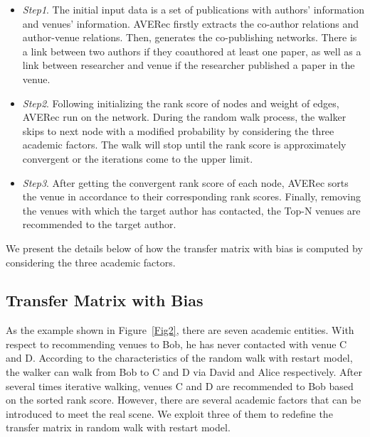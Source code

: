 \documentclass[9pt]{acm_proc_article-sp}
\begin{document}
\begin{itemize}
  \item \emph{Step1}. The initial input data is a set of publications with authors' information and venues' information. AVERec firstly extracts the co-author relations and author-venue relations. Then, generates the co-publishing networks. There is a link between two authors if they coauthored at least one paper, as well as a link between researcher and venue if the researcher published a paper in the venue.
  \item \emph{Step2}. Following initializing the rank score of nodes and weight of edges, AVERec run on the network. During the random walk process, the walker skips to next node with a modified probability by considering the three academic factors. The walk will stop until the rank score is approximately convergent or the iterations come to the upper limit.
  \item \emph{Step3}. After getting the convergent rank score of each node, AVERec sorts the venue in accordance to their corresponding rank scores. Finally, removing the venues with which the target author has contacted, the Top-N venues are recommended to the target author.
\end{itemize}

We present the details below of how the transfer matrix with bias is computed by considering the three academic factors.

\subsection{Transfer Matrix with Bias}
As the example shown in Figure~\ref{Fig2}, there are seven academic entities. With respect to recommending venues to Bob, he has never contacted with venue C and D. According to the characteristics of the random walk with restart model, the walker can walk from Bob to C and D via David and Alice respectively. After several times iterative walking, venues C and D are recommended to Bob based on the sorted rank score. However, there are several academic factors that can be introduced to meet the real scene. We exploit three of them to redefine the transfer matrix in random walk with restart model.
\end{document}
